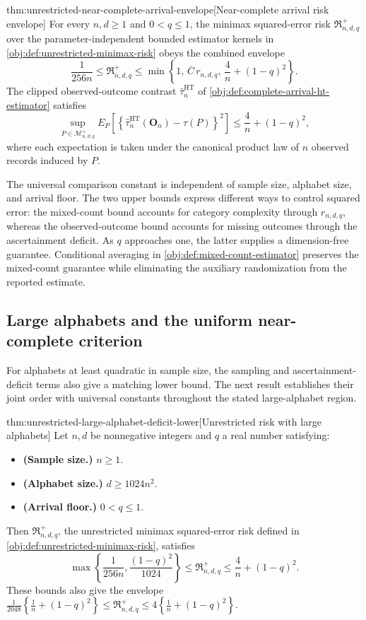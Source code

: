\begin{theoremv}{thm:unrestricted-near-complete-arrival-envelope}[Near-complete arrival risk envelope]
For every \(n,d\ge1\) and \(0<q\le1\), the minimax squared-error risk \(\mathfrak R^{+}_{n,d,q}\) over the parameter-independent bounded estimator kernels in \cref{obj:def:unrestricted-minimax-risk} obeys the combined envelope
\[
\frac{1}{256n}
\le
\mathfrak R^{+}_{n,d,q}
\le
\min\left\{
1,\,
\overline C\,r_{n,d,q},\,
\frac4n+(1-q)^2
\right\}.
\]
The clipped observed-outcome contrast \(\widehat\tau^{\mathrm{HT}}_n\) of \cref{obj:def:complete-arrival-ht-estimator} satisfies
\[
\sup_{P\in\mathcal M^{+}_{n,d,q}}
E_P\!\left[
\left\{
\widehat\tau^{\mathrm{HT}}_n(\mathbf O_n)-\tau(P)
\right\}^{2}
\right]
\le
\frac4n+(1-q)^2,
\]
where each expectation is taken under the canonical product law of \(n\) observed records induced by \(P\).
\end{theoremv}

The universal comparison constant  is independent of sample size, alphabet size, and arrival floor. The two upper bounds express different ways to control squared error: the mixed-count bound accounts for category complexity through \(r_{n,d,q}\), whereas the observed-outcome bound accounts for missing outcomes through the ascertainment deficit. As \(q\) approaches one, the latter supplies a dimension-free guarantee. Conditional averaging in \cref{obj:def:mixed-count-estimator} preserves the mixed-count guarantee while eliminating the auxiliary randomization from the reported estimate.

\subsection{Large alphabets and the uniform near-complete criterion}

For alphabets at least quadratic in sample size, the sampling and ascertainment-deficit terms also give a matching lower bound. The next result establishes their joint order with universal constants throughout the stated large-alphabet region.

\begin{theoremv}{thm:unrestricted-large-alphabet-deficit-lower}[Unrestricted risk with large alphabets]
Let \(n,d\) be nonnegative integers and \(q\) a real number satisfying:
\begin{itemize}
\item \textbf{(Sample size.)} \(n\ge 1\).
\item \textbf{(Alphabet size.)} \(d\ge 1024n^2\).
\item \textbf{(Arrival floor.)} \(0<q\le 1\).
\end{itemize}
Then \(\mathfrak R^{+}_{n,d,q}\), the unrestricted minimax squared-error risk defined in \cref{obj:def:unrestricted-minimax-risk}, satisfies
\[
\max\left\{\frac{1}{256n},\frac{(1-q)^2}{1024}\right\}
\le \mathfrak R^{+}_{n,d,q}
\le \frac{4}{n}+(1-q)^2.
\]
These bounds also give the envelope
\(\frac{1}{2048}\left\{\frac{1}{n}+(1-q)^2\right\}
\le \mathfrak R^{+}_{n,d,q}
\le 4\left\{\frac{1}{n}+(1-q)^2\right\}\).
\end{theoremv}

